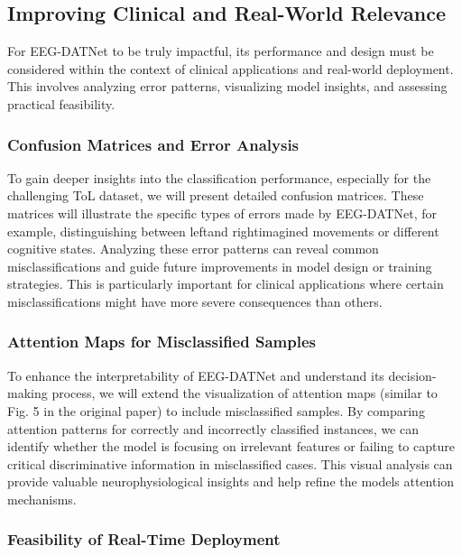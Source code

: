 \documentclass[pdflatex,sn-mathphys-num]{sn-jnl}
\theoremstyle{thmstyleone}%
\theoremstyle{thmstyletwo}%
\theoremstyle{thmstylethree}%
\begin{document}
\subsection{Improving Clinical and Real-World Relevance}

For EEG-DATNet to be truly impactful, its performance and design must be considered within the context of clinical applications and real-world deployment. This involves analyzing error patterns, visualizing model insights, and assessing practical feasibility.

\subsubsection{Confusion Matrices and Error Analysis}

To gain deeper insights into the classification performance, especially for the challenging ToL dataset, we will present detailed confusion matrices. These matrices will illustrate the specific types of errors made by EEG-DATNet, for example, distinguishing between \textquotesingle left\textquotesingle and \textquotesingle right\textquotesingle imagined movements or different cognitive states. Analyzing these error patterns can reveal common misclassifications and guide future improvements in model design or training strategies. This is particularly important for clinical applications where certain misclassifications might have more severe consequences than others.

\subsubsection{Attention Maps for Misclassified Samples}

To enhance the interpretability of EEG-DATNet and understand its decision-making process, we will extend the visualization of attention maps (similar to Fig. 5 in the original paper) to include misclassified samples. By comparing attention patterns for correctly and incorrectly classified instances, we can identify whether the model is focusing on irrelevant features or failing to capture critical discriminative information in misclassified cases. This visual analysis can provide valuable neurophysiological insights and help refine the model\textquotesingle s attention mechanisms.

\subsubsection{Feasibility of Real-Time Deployment}
\end{document}
